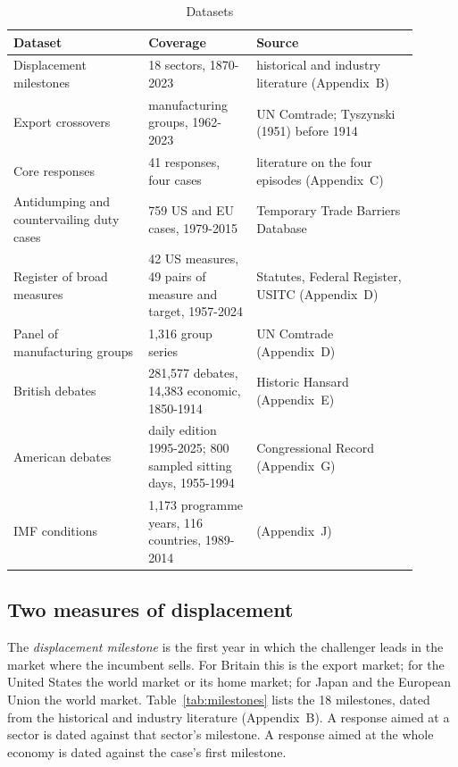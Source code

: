 \documentclass[review,authoryear,12pt]{elsarticle}
\begin{document}
\begin{table}[t]
\centering\footnotesize
\caption{Datasets}\label{tab:data}
\begin{tabular}{L{0.30\linewidth}L{0.24\linewidth}L{0.36\linewidth}}
\toprule
Dataset & Coverage & Source \\
\midrule
Displacement milestones & 18 sectors, 1870-2023 & historical and industry literature (Appendix~B) \\
Export crossovers & manufacturing groups, 1962-2023 & UN Comtrade; Tyszynski (1951) before 1914 \\
Core responses & 41 responses, four cases & literature on the four episodes (Appendix~C) \\
Antidumping and countervailing duty cases & 759 US and EU cases, 1979-2015 & Temporary Trade Barriers Database \\
Register of broad measures & 42 US measures, 49 pairs of measure and target, 1957-2024 & Statutes, Federal Register, USITC (Appendix~D) \\
Panel of manufacturing groups & 1,316 group series & UN Comtrade (Appendix~D) \\
British debates & 281,577 debates, 14,383 economic, 1850-1914 & Historic Hansard (Appendix~E) \\
American debates & daily edition 1995-2025; 800 sampled sitting days, 1955-1994 & Congressional Record (Appendix~G) \\
IMF conditions & 1,173 programme years, 116 countries, 1989-2014 & \citet{stubbs2020} (Appendix~J) \\
\bottomrule
\end{tabular}
\end{table}

\subsection{Two measures of displacement}

The \emph{displacement milestone} is the first year in which the challenger leads in the market where the incumbent sells. For Britain this is the export market; for the United States the world market or its home market; for Japan and the European Union the world market. Table~\ref{tab:milestones} lists the 18 milestones, dated from the historical and industry literature (Appendix~B). A response aimed at a sector is dated against that sector's milestone. A response aimed at the whole economy is dated against the case's first milestone.
\end{document}
